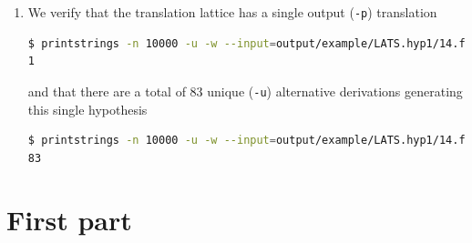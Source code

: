 \documentclass[a4paper,oneside,reqno]{amsart}
\begin{document}
\begin{enumerate}[label=\arabic*.]
  \item We verify that the translation lattice has a single output (\texttt{-p}) translation
    \begin{lstlisting}[language=bash]
$ printstrings -n 10000 -u -w --input=output/example/LATS.hyp1/14.fst.gz -p | sed '/[EMPTY]/d' | wc -l
1
    \end{lstlisting}
    and that there are a total of 83 unique (\texttt{-u}) alternative
    derivations generating this single hypothesis
    \begin{lstlisting}[language=bash]
$ printstrings -n 10000 -u -w --input=output/example/LATS.hyp1/14.fst.gz | sed '/[EMPTY]/d' | wc -l
83
    \end{lstlisting}
\end{enumerate}

\section{First part}
\end{document}
